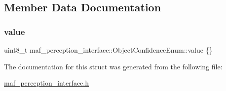 \subsection{Member Data Documentation}
\mbox{\label{structmaf__perception__interface_1_1ObjectConfidenceEnum_abfe470eb22e59bc7d1aa69ae42af78b0}} 
\subsubsection{\texorpdfstring{value}{value}}
{\footnotesize\ttfamily uint8\+\_\+t maf\+\_\+perception\+\_\+interface\+::\+Object\+Confidence\+Enum\+::value \{\}}



The documentation for this struct was generated from the following file\+:\begin{DoxyCompactItemize}
\item 
\hyperlink{maf__perception__interface_8h}{maf\+\_\+perception\+\_\+interface.\+h}\end{DoxyCompactItemize}

